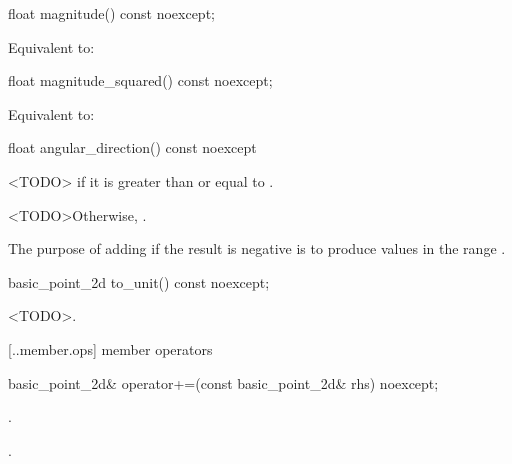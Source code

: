 %
\begin{itemdecl}
float magnitude() const noexcept;
\end{itemdecl}
\begin{itemdescr}
\pnum
\returns
Equivalent to: 
\end{itemdescr}

%
\begin{itemdecl}
float magnitude_squared() const noexcept;
\end{itemdecl}
\begin{itemdescr}
\pnum
\returns
Equivalent to: 
\end{itemdescr}

%
\begin{itemdecl}
float angular_direction() const noexcept
\end{itemdecl}
\begin{itemdescr}
\pnum
\returns
<TODO> if it is greater than or equal to .

\pnum
<TODO>Otherwise, . 

\pnum
\begin{note}
The purpose of adding  if the result is negative is to produce values in the range .
\end{note}
\end{itemdescr}

%
\begin{itemdecl}
basic_point_2d to_unit() const noexcept;
\end{itemdecl}
\begin{itemdescr}
\pnum
\returns
<TODO>.
\end{itemdescr}

 [\iotwod.\pointtwod.member.ops] { member operators}

%
\begin{itemdecl}
basic_point_2d& operator+=(const basic_point_2d& rhs) noexcept;
\end{itemdecl}
\begin{itemdescr}
\pnum
\effects
{}.
	
\pnum
\returns
{}.
\end{itemdescr}

